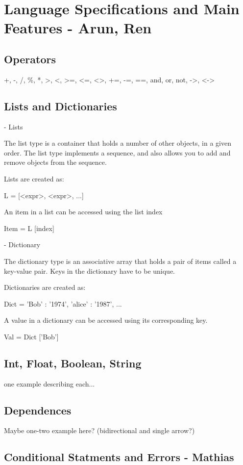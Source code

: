 \section{Language Specifications and Main Features - Arun, Ren}
\label{sect:spec}

\subsection{Operators}
+, -, /, \%, *, >, <, >=, <=, <>, +=, -=, ==, and, or, not, ->, <->

\subsection{Lists and Dictionaries}

- Lists

The list type is a container that holds a number of other objects, in a given order.
The list type implements a sequence, and also allows you to add and remove objects from the sequence.

Lists are created as:

L = [<expr>, <expr>, ...]

An item in a list can be accessed using the list index

Item = L [index]



- Dictionary

The dictionary type is an associative array that holds a pair of items called a key-value pair.
Keys in the dictionary have to be unique.

Dictionaries are created as:

Dict = { 'Bob' : '1974', 'alice' : '1987', ...}

A value in a dictionary can be accessed using its corresponding key.

Val = Dict ['Bob']




\subsection{Int, Float, Boolean,  String}
one example describing each...

\subsection{Dependences}
Maybe one-two example here? (bidirectional and single arrow?)

\subsection{Conditional Statments and Errors - Mathias}

